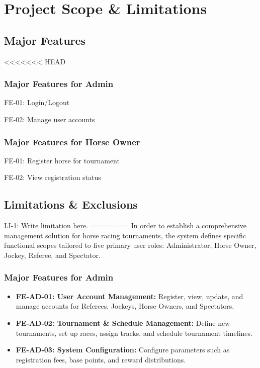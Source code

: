 \section{Project Scope \& Limitations}

\subsection{Major Features}

<<<<<<< HEAD
\subsubsection{Major Features for Admin}

FE-01: Login/Logout

FE-02: Manage user accounts

\subsubsection{Major Features for Horse Owner}

FE-01: Register horse for tournament

FE-02: View registration status

\subsection{Limitations \& Exclusions}

LI-1: Write limitation here.
=======
In order to establish a comprehensive management solution for horse racing tournaments, the system defines specific functional scopes tailored to five primary user roles: Administrator, Horse Owner, Jockey, Referee, and Spectator.

\subsubsection{Major Features for Admin}
\begin{itemize}
    \item \textbf{FE-AD-01: User Account Management:} Register, view, update, and manage accounts for Referees, Jockeys, Horse Owners, and Spectators.
    \item \textbf{FE-AD-02: Tournament \& Schedule Management:} Define new tournaments, set up races, assign tracks, and schedule tournament timelines.
    \item \textbf{FE-AD-03: System Configuration:} Configure parameters such as registration fees, base points, and reward distributions.
\end{itemize}

